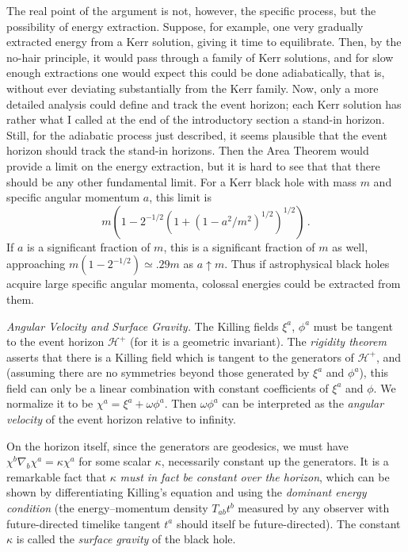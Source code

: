 \documentclass[
%
draft    %
,numberedheadings 
,bibliocites
  ]
  {aipproc}
\newcommand{\Hf}{{{\mathscr H}^{+}}} %
\begin{document}
The real point of the argument is not, however, the specific process, but the possibility of energy extraction.  Suppose, for example, one very gradually extracted energy from a Kerr solution, giving it time to equilibrate.  Then, by the no-hair principle, it would pass through a family of Kerr solutions, and 
for slow enough extractions one would expect this could be done adiabatically, that is, without ever deviating substantially from the Kerr family.  Now, only a more detailed analysis could define and track the event horizon; each Kerr solution has rather what I called at the end of the introductory section a stand-in horizon. 
Still, for the adiabatic process just described, it seems plausible that the event horizon should track the stand-in horizons.  Then the Area Theorem would provide a limit on the energy extraction, but it is hard to see that that there should be any other fundamental limit.  For a Kerr black hole with mass $m$ and specific angular momentum $a$, this limit is
\begin{equation}
  m(1-2^{-1/2}(1+(1-a^2/m^2)^{1/2})^{1/2})\, .
\end{equation}
If $a$ is a significant fraction of $m$, this is a significant fraction of $m$ as well, approaching $m(1-2^{-1/2})\simeq .29 m$ as $a\uparrow m$.  Thus if astrophysical black holes acquire large specific angular momenta, colossal energies could be extracted from them.


{\em Angular Velocity and Surface Gravity.}
The Killing fields $\xi ^a$, $\phi ^a$ must be tangent to the event horizon $\Hf$ (for it is a geometric invariant).  The {\em rigidity theorem}~\citep{Hawking:1971vc,Hawking:1973uf} asserts that there is a Killing field which is tangent to the generators of $\Hf$, and
(assuming there are no symmetries beyond those generated by $\xi ^a$ and $\phi ^a$), this field can only be a linear combination with constant coefficients of $\xi ^a$ and $\phi$.  We normalize it to be $\chi ^a=\xi ^a+\omega\phi ^a$.
Then $\omega \phi ^a$ can be interpreted as the {\em angular velocity} of the event horizon relative to infinity.  

On the horizon itself, since the generators are geodesics, we must have $\chi ^b\nabla _b\chi ^a=\kappa \chi ^a$ for some scalar $\kappa$, necessarily constant up the generators.  It is a remarkable fact that $\kappa$ {\em must in fact be constant over the horizon}, which can be shown by differentiating Killing's equation and using the {\em dominant energy condition} (the energy--momentum density $T_{ab}t^b$ measured by any observer with future-directed timelike tangent $t^a$ should itself be future-directed).
The constant $\kappa$ is called the {\em surface gravity} of the black hole.
\end{document}
